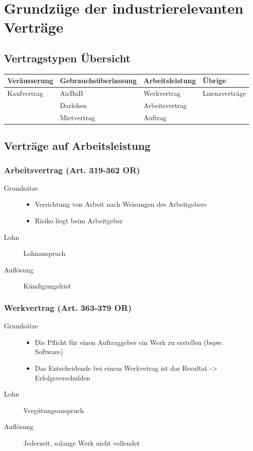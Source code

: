 \section{Grundzüge der industrierelevanten Verträge}

\subsection{Vertragstypen Übersicht}

\begin{tabular}{l|l|l|l}
Veräusserung & Gebrauchsüberlassung & Arbeitsleistung &
Übrige\\\hline
Kaufvertrag & AirBnB & Werkvertrag & Lizenzverträge \\
& Darlehen & Arbeitsvertrag & \\
& Mietvertrag & Auftrag & \\
\end{tabular}

\subsection{Verträge auf Arbeitsleistung}

\subsubsection{Arbeitsvertrag (Art. 319-362 OR)}

\begin{description}
	\item[Grundsätze] \mbox{}
	\begin{itemize}
		\tightlist
		\item Verrichtung von Arbeit nach Weisungen des Arbeitgebers
		\item Risiko liegt beim Arbeitgeber
	\end{itemize}
	\item[Lohn] Lohnanspruch
	\item[Auflösung] Kündigungsfrist
\end{description}

\subsubsection{Werkvertrag (Art. 363-379 OR)}

\begin{description}
	\item[Grundsätze] \mbox{}
	\begin{itemize}
		\tightlist
		\item Die Pflicht für einen Auftraggeber ein Werk zu erstellen (bspw.
		Software)
		\item Das Entscheidende bei einem Werkvetrag ist das Resultat
		-> Erfolgsverschulden
	\end{itemize}
	\item[Lohn] Vergütungsanspruch
	\item[Auflösung] Jederzeit, solange Werk nicht vollendet
\end{description}

